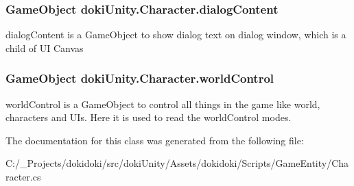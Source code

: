 \subsubsection[{\texorpdfstring{dialog\+Content}{dialogContent}}]{\setlength{\rightskip}{0pt plus 5cm}Game\+Object doki\+Unity.\+Character.\+dialog\+Content}\hypertarget{classdoki_unity_1_1_character_aa8f3d81d111e099a3a85fcb81ce09f32}{}\label{classdoki_unity_1_1_character_aa8f3d81d111e099a3a85fcb81ce09f32}


dialog\+Content is a Game\+Object to show dialog text on dialog window, which is a child of UI Canvas 

\subsubsection[{\texorpdfstring{world\+Control}{worldControl}}]{\setlength{\rightskip}{0pt plus 5cm}Game\+Object doki\+Unity.\+Character.\+world\+Control}\hypertarget{classdoki_unity_1_1_character_a914f000a12efc5a53d6f0893cdccd5da}{}\label{classdoki_unity_1_1_character_a914f000a12efc5a53d6f0893cdccd5da}


world\+Control is a Game\+Object to control all things in the game like world, characters and U\+Is. Here it is used to read the world\+Control modes. 



The documentation for this class was generated from the following file\+:\begin{DoxyCompactItemize}
\item 
C\+:/\+\_\+\+Projects/dokidoki/src/doki\+Unity/\+Assets/dokidoki/\+Scripts/\+Game\+Entity/Character.\+cs\end{DoxyCompactItemize}
